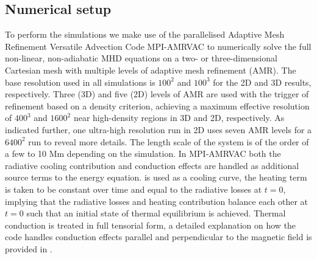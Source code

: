\subsection{Numerical setup}
To perform the simulations we make use of the parallelised Adaptive Mesh Refinement Versatile Advection Code MPI-AMRVAC \citep{keppens2012_amrvac,porth2014_amrvac,xia2018_amrvac} to numerically solve the full non-linear, non-adiabatic MHD equations on a two- or three-dimensional Cartesian mesh with multiple levels of adaptive mesh refinement (AMR). The base resolution used in all simulations is $100^2$ and $100^3$ for the 2D and 3D results, respectively. Three (3D) and five (2D) levels of AMR are used with the trigger of refinement based on a density criterion, achieving a maximum effective resolution of $400^3$ and $1600^2$ near high-density regions in 3D and 2D, respectively. As indicated further, one ultra-high resolution run in 2D uses seven AMR levels for a $6400^2$ run to reveal more details. The length scale of the system is of the order of a few to 10 Mm depending on the simulation. In MPI-AMRVAC both the radiative cooling contribution and conduction effects are handled as additional source terms to the energy equation. {\spexdm} is used as a cooling curve, the heating term is taken to be constant over time and equal to the radiative losses at $t = 0$, implying that the radiative losses and heating contribution balance each other at $t = 0$ such that an initial state of thermal equilibrium is achieved. Thermal conduction is treated in full tensorial form, a detailed explanation on how the code handles conduction effects parallel and perpendicular to the magnetic field is provided in \citet{xia2018_amrvac}.

